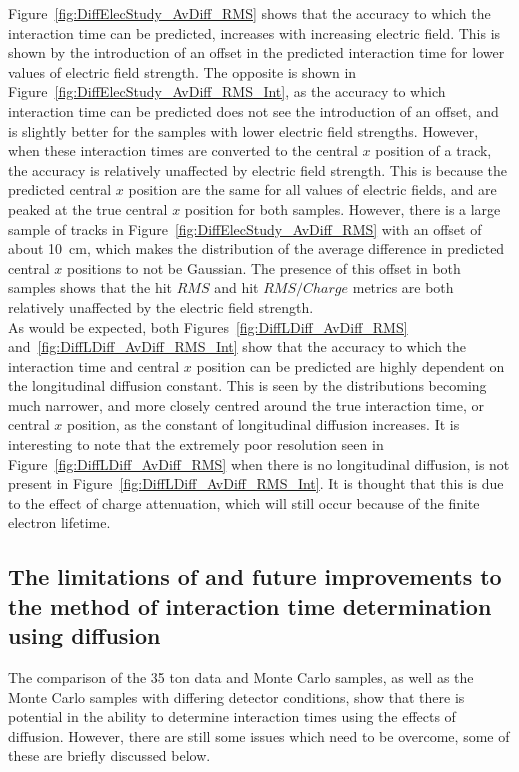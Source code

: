Figure~\ref{fig:DiffElecStudy_AvDiff_RMS} shows that the accuracy to which the interaction time can be predicted, increases with increasing electric field. This is shown by the introduction of an offset in the predicted interaction time for lower values of electric field strength. The opposite is shown in Figure~\ref{fig:DiffElecStudy_AvDiff_RMS_Int}, as the accuracy to which interaction time can be predicted does not see the introduction of an offset, and is slightly better for the samples with lower electric field strengths. However, when these interaction times are converted to the central $x$ position of a track, the accuracy is relatively unaffected by electric field strength. This is because the predicted central $x$ position are the same for all values of electric fields, and are peaked at the true central $x$ position for both samples. However, there is a large sample of tracks in Figure~\ref{fig:DiffElecStudy_AvDiff_RMS} with an offset of about 10~cm, which makes the distribution of the average difference in predicted central $x$ positions to not be Gaussian. The presence of this offset in both samples shows that the hit $RMS$ and hit $RMS/Charge$ metrics are both relatively unaffected by the electric field strength. \\

As would be expected, both Figures~\ref{fig:DiffLDiff_AvDiff_RMS} and~\ref{fig:DiffLDiff_AvDiff_RMS_Int} show that the accuracy to which the interaction time and central $x$ position can be predicted are highly dependent on the longitudinal diffusion constant. This is seen by the distributions becoming much narrower, and more closely centred around the true interaction time, or central $x$ position, as the constant of longitudinal diffusion increases. It is interesting to note that the extremely poor resolution seen in Figure~\ref{fig:DiffLDiff_AvDiff_RMS} when there is no longitudinal diffusion, is not present in Figure~\ref{fig:DiffLDiff_AvDiff_RMS_Int}. It is thought that this is due to the effect of charge attenuation, which will still occur because of the finite electron lifetime. 

\subsection{The limitations of and future improvements to the method of interaction time determination using diffusion} \label{sec:DiffLimitations}
The comparison of the 35 ton data and Monte Carlo samples, as well as the Monte Carlo samples with differing detector conditions, show that there is potential in the ability to determine interaction times using the effects of diffusion. However, there are still some issues which need to be overcome, some of these are briefly discussed below. \\

